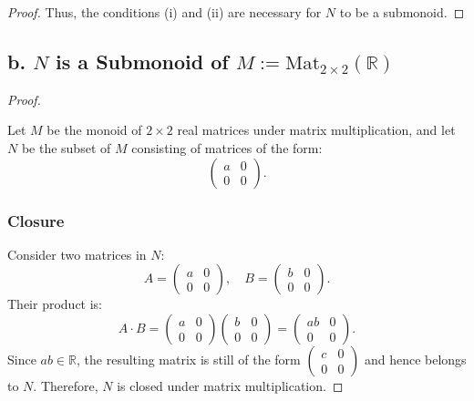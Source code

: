 \documentclass[12pt]{amsart}
\theoremstyle{definition}
\numberwithin{equation}{section}
\newcommand{\R}{\mathbb{R}}
\begin{document}
\begin{exercise}{2}
\begin{proof}
    Thus, the conditions (i) and (ii) are necessary for \(N\) to be a submonoid.
    
    \end{proof} 
    
    \subsection*{\textbf{b. \(N\) is a Submonoid of \(M := \text{Mat}_{2 \times 2}(\R)\)}}
    
    \begin{proof} \( \)
    
    Let \(M\) be the monoid of \(2 \times 2\) real matrices under matrix multiplication, and let \(N\) be the subset of \(M\) consisting of matrices of the form:
    \[
    \begin{pmatrix}
    a & 0 \\
    0 & 0
    \end{pmatrix}.
    \]
    
    \subsubsection*{Closure}
    
    Consider two matrices in \(N\):
    \[
    A = \begin{pmatrix}
    a & 0 \\
    0 & 0
    \end{pmatrix}, \quad B = \begin{pmatrix}
    b & 0 \\
    0 & 0
    \end{pmatrix}.
    \]
    Their product is:
    \[
    A \cdot B = \begin{pmatrix}
    a & 0 \\
    0 & 0
    \end{pmatrix}
    \begin{pmatrix}
    b & 0 \\
    0 & 0
    \end{pmatrix} = \begin{pmatrix}
    ab & 0 \\
    0 & 0
    \end{pmatrix}.
    \]
    Since \(ab \in \R\), the resulting matrix is still of the form \(\begin{pmatrix} c & 0 \\ 0 & 0 \end{pmatrix}\) and hence belongs to \(N\). Therefore, \(N\) is closed under matrix multiplication.
    

\end{proof}
\end{exercise}
\end{document}
